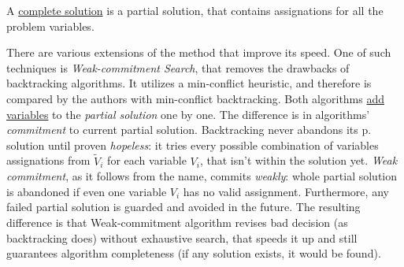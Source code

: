 \documentclass[../header]{subfiles}
\begin{document}
\medskip\noindent
A \underline{complete solution} is a partial solution,
that contains assignations for all the problem variables.

\bigskip
There are various extensions of the method that improve its speed.
One of such techniques is \emph{Weak-commitment Search}\cite{Weak-commitment},
that removes the drawbacks of backtracking algorithms. It utilizes a min-conflict
heuristic, and therefore is compared by the authors with min-conflict backtracking.
Both algorithms \underline{add variables} to the \emph{partial solution} one by one.
The difference is in algorithms' \emph{commitment} to current partial solution.
Backtracking never abandons its p. solution until proven \emph{hopeless}:
it tries every possible combination of variables assignations from ${\tilde V}_i$
for each variable $V_i$, that isn't within the solution yet.
\emph{Weak commitment}, as it follows from the name, commits \emph{weakly}:
whole partial solution is abandoned if even one variable $V_i$ has no valid
assignment. Furthermore, any failed partial solution is guarded and avoided in
the future. The resulting difference is that Weak-commitment algorithm revises
bad decision (as backtracking does) without exhaustive search, that speeds it up
and still guarantees algorithm completeness (if any solution exists, it would be found).
\end{document}
